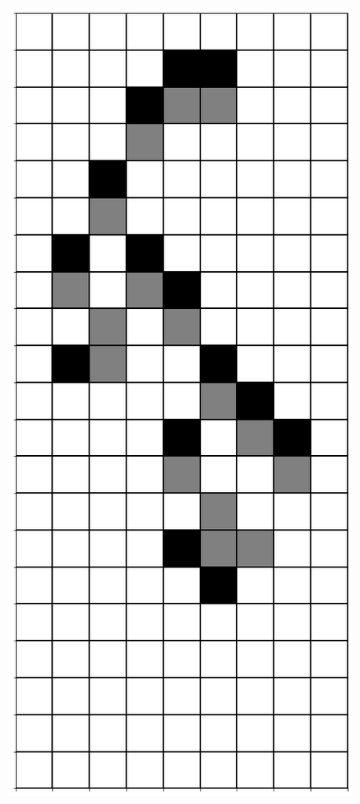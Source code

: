 \documentclass[12pt]{article}
\numberwithin{figure}{section} %
\begin{document}
\begin{figure}[H]
\begin{subfigure}{0.19\textwidth}
     		\subcaption{}
   	\end{subfigure}
        	\begin{subfigure}{0.19\textwidth}
     		\centering
     		\includegraphics[width=\linewidth]{Section4/25.4}

\end{subfigure}
\end{figure}
\end{document}
